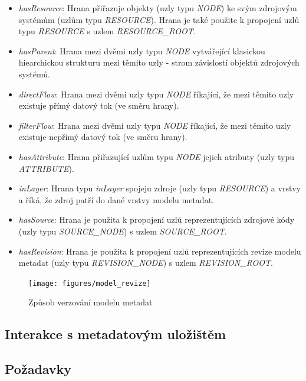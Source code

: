  \begin{itemize}
	\item{\textit{hasResource}}: Hrana přiřazuje objekty (uzly typu \textit{NODE}) ke svým zdrojovým systémům (uzlům typu \textit{RESOURCE}). Hrana je také použite k propojení uzlů typu \textit{RESOURCE} s uzlem \textit{RESOURCE\_ROOT}.
	\item{\textit{hasParent}}: Hrana mezi dvěmi uzly typu \textit{NODE} vytvářející klasickou hiearchickou strukturu mezi těmito uzly - strom závislostí objektů zdrojových systémů. 
	\item{\textit{directFlow}}: Hrana mezi dvěmi uzly typu \textit{NODE} říkající, že mezi těmito uzly existuje přímý datový tok (ve směru hrany).
	\item{\textit{filterFlow}}: Hrana mezi dvěmi uzly typu \textit{NODE} říkající, že mezi těmito uzly existuje nepřímý datový tok (ve směru hrany).
	\item{\textit{hasAttribute}}: Hrana přiřazující uzlům typu \textit{NODE} jejich atributy (uzly typu \textit{ATTRIBUTE}).
	\item{\textit{inLayer}}: Hrana typu \textit{inLayer} spojeju zdroje (uzly typu \textit{RESOURCE}) a vrstvy a říká, že zdroj patří do dané vrstvy modelu metadat. 
	\item{\textit{hasSource}}: Hrana je použita k propojení uzlů reprezentujících zdrojové kódy (uzly typu \textit{SOURCE_NODE}) s uzlem \textit{SOURCE\_ROOT}.
	\item{\textit{hasRevision}}: Hrana je použita k propojení uzlů reprezentujících revize modelu metadat (uzly typu \textit{REVISION_NODE}) s uzlem \textit{REVISION\_ROOT}.
\end{itemize}

\begin{figure}
\begin{center}
\texttt{[image: figures/model\_revize]}
\caption{Způsob verzování modelu metadat}
\label{fig:ana-model-rev}
\end{center}
\end{figure}


\subsection{Interakce s metadatovým uložištěm}
\label{sec:ana_interactions}





\subsection{Požadavky}


